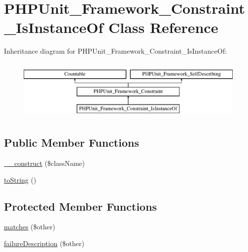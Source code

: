\hypertarget{class_p_h_p_unit___framework___constraint___is_instance_of}{}\section{P\+H\+P\+Unit\+\_\+\+Framework\+\_\+\+Constraint\+\_\+\+Is\+Instance\+Of Class Reference}
\label{class_p_h_p_unit___framework___constraint___is_instance_of}
Inheritance diagram for P\+H\+P\+Unit\+\_\+\+Framework\+\_\+\+Constraint\+\_\+\+Is\+Instance\+Of\+:\begin{figure}[H]
\begin{center}
\leavevmode
\includegraphics[height=3.000000cm]{class_p_h_p_unit___framework___constraint___is_instance_of}
\end{center}
\end{figure}
\subsection*{Public Member Functions}
\begin{DoxyCompactItemize}
\item 
\mbox{\hyperlink{class_p_h_p_unit___framework___constraint___is_instance_of_a9b3aa4f43875a1fc02f564f4a077b33a}{\+\_\+\+\_\+construct}} (\$class\+Name)
\item 
\mbox{\hyperlink{class_p_h_p_unit___framework___constraint___is_instance_of_a5558c5d549f41597377fa1ea8a1cefa3}{to\+String}} ()
\end{DoxyCompactItemize}
\subsection*{Protected Member Functions}
\begin{DoxyCompactItemize}
\item 
\mbox{\hyperlink{class_p_h_p_unit___framework___constraint___is_instance_of_a9c9c337de483bbdbb9fa249a6c7c9cc5}{matches}} (\$other)
\item 
\mbox{\hyperlink{class_p_h_p_unit___framework___constraint___is_instance_of_aaabb679273bfb812df4d81c283754a59}{failure\+Description}} (\$other)
\end{DoxyCompactItemize}
